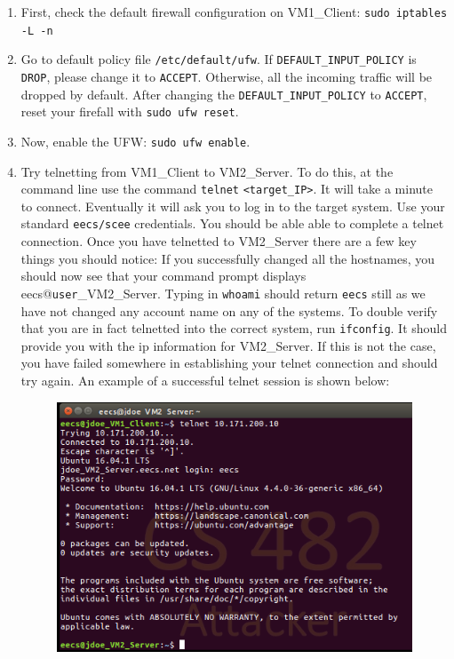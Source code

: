 \begin{enumerate}
\item First, check the default firewall configuration on VM1\_Client: {\tt sudo iptables -L -n}

\item Go to default policy file {\tt /etc/default/ufw}. If 
{\tt DEFAULT\_INPUT\_POLICY} is {\tt DROP}, please change it to {\tt ACCEPT}.  
Otherwise, all the incoming traffic will be dropped by default.
After changing the {\tt DEFAULT\_INPUT\_POLICY} to {\tt ACCEPT}, reset your firefall with {\tt sudo ufw reset}.
\item Now, enable the UFW: {\tt sudo ufw enable}.
\item Try telnetting from VM1\_Client to VM2\_Server. To do this, at the command line use the command {\tt telnet} {\tt <target\_IP>}. It will take a minute to connect. Eventually it will ask you to log in to the target system. Use your standard {\tt eecs/scee} credentials. You should be able able to complete a telnet connection. Once you have telnetted to VM2\_Server there are a few key things you should notice: If you successfully changed all the hostnames, you should now see that your command prompt displays eecs@{\tt user}\_VM2\_Server. Typing in {\tt whoami} should return {\tt eecs} still as we have not changed any account name on any of the systems. To double verify that you are in fact telnetted into the correct system, run {\tt ifconfig}. It should provide you with the ip information for VM2\_Server. If this is not the case, you have failed somewhere in establishing your telnet connection and should try again. An example of a successful telnet session is shown below:
\begin{figure}[htb]
        \centering
        \includegraphics*[width=.7\textwidth]{Figs/telnet.png}
\end{figure}


\end{enumerate}

